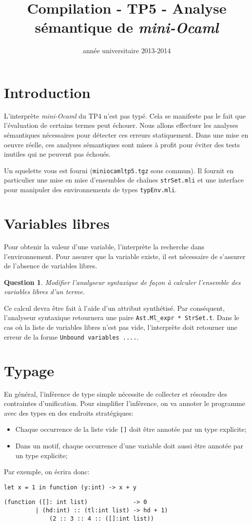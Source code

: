 \documentclass{article}
\title{Compilation - TP5 - Analyse sémantique de \emph{mini-Ocaml}}
\date{année universitaire 2013-2014}
\newtheorem{question}{Question}[section]
\newcommand{\Question}[1]{\begin{question}#1\end{question}}
\begin{document}
\maketitle
\section{Introduction}
L'interprète \emph{mini-Ocaml} du TP4 n'est pas typé. Cela se manifeste pas le fait que l'évaluation
de certains termes peut échouer. Nous allons effectuer les analyses sémantiques nécessaires pour
détecter ces erreurs statiquement. Dans une mise en oeuvre réelle, ces analyses sémantiques
sont mises à profit pour éviter des tests inutiles qui ne peuvent pas échoués.

Un squelette vous est fourni ({\tt miniocamltp5.tgz} sous commun). Il fournit en particulier une
mise en mise d'ensembles de chaînes {\tt strSet.mli} et une interface pour manipuler des environnements de types {\tt typEnv.mli}.

\section{Variables libres}

Pour obtenir la valeur d'une variable, l'interprète la recherche dans l'environnement.  Pour assurer
que la variable existe, il est nécessaire de s'assurer de l'absence de variables libres.

\Question{Modifier l'analyseur syntaxique de façon à calculer l'ensemble des variables libres d'un
  terme.}  Ce calcul devra être fait à l'aide d'un attribut synthétisé. Par conséquent, l'analyseur
syntaxique retournera une paire {\tt Ast.Ml\_expr * StrSet.t}. Dans le cas où la liste de
variables libres n'est pas vide, l'interprète doit retourner une erreur de la forme {\tt Unbound variables ....}.

\section{Typage}

En général, l'inférence de type simple nécessite de collecter et résoudre des contraintes d'unification.
%
Pour simplifier l'inférence, on va annoter le programme avec des types en des endroits stratégiques:
\begin{itemize}
\item Chaque occurrence de la liste vide {\tt []} doit être annotée par un type explicite;
\item Dans un motif, chaque occurrence d'une variable doit aussi être annotée par un type explicite;
\end{itemize}
Par exemple, on écrira donc:\\
\begin{center}
{\tt let x = 1 in function (y:int) -> x + y }
\end{center}
\begin{verbatim}
(function ([]: int list)             -> 0
         | (hd:int) :: (tl:int list) -> hd + 1)
             (2 :: 3 :: 4 :: ([]:int list))
\end{verbatim}
\end{document}
